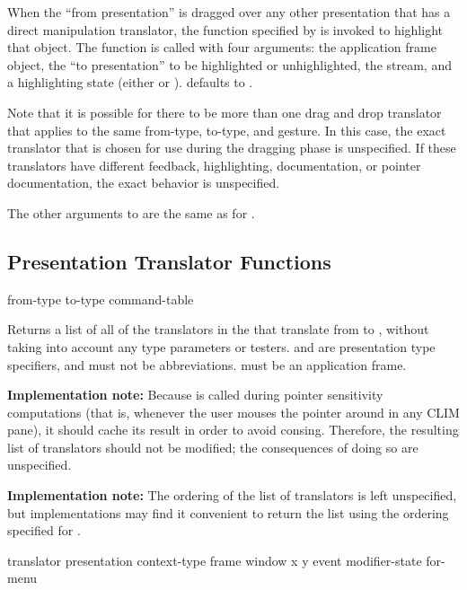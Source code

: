 When the ``from presentation'' is dragged over any other presentation that has a
direct manipulation translator, the function specified by  is
invoked to highlight that object.  The function is called with four arguments:
the application frame object, the ``to presentation'' to be highlighted or
unhighlighted, the stream, and a highlighting state (either  or
).   defaults to
.

Note that it is possible for there to be more than one drag and drop translator
that applies to the same from-type, to-type, and gesture.  In this case, the
exact translator that is chosen for use during the dragging phase is
unspecified.  If these translators have different feedback, highlighting,
documentation, or pointer documentation, the exact behavior is unspecified.

The other arguments to  are the same as for
.


\subsection {Presentation Translator Functions}

 {from-type to-type command-table}

Returns a list of all of the translators in the 
 that translate from  to ,
without taking into account any type parameters or testers.   and
 are presentation type specifiers, and must not be abbreviations.
 must be an application frame.

{\bf Implementation note:} Because  is called
during pointer sensitivity computations (that is, whenever the user mouses the
pointer around in any CLIM pane), it should cache its result in order to avoid
consing.  Therefore, the resulting list of translators should not be modified;
the consequences of doing so are unspecified.

{\bf Implementation note:} The ordering of the list of translators is left
unspecified, but implementations may find it convenient to return the list using
the ordering specified for .


 {translator presentation context-type frame window x y
                                       \key event modifier-state for-menu}

